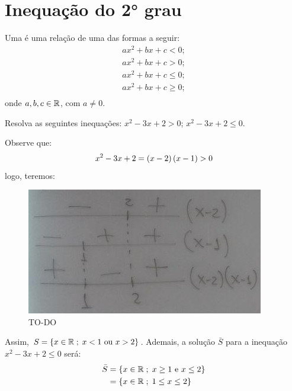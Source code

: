 \section{Inequação do 2° grau}

\begin{definition}
Uma  é uma relação de uma das formas
a seguir:
%
\begin{gather*}
ax^2 +bx + c <0;\\
ax^2 +bx + c>0;\\
ax^2 +bx + c \le 0;\\
ax^2 +bx + c \ge 0;\\
\end{gather*}
%
onde $a, b, c \in \mathbb{R}$, com $ a \ne 0$.
\end{definition}

\begin{example}
Resolva as seguintes inequações: $x^2 -3x +2 > 0$; $x^2 -3x +2 \le 0$.
\end{example}

\begin{solution}
Observe que: 
%
\begin{align*}
x^2-3x+2=\left(x-2\right)\left(x-1\right)>0
\end{align*}
%
\noindent logo, teremos:

\begin{figure}[H]
\caption{TO-DO}
\includegraphics{quadros/03_equacoes_e_inequacoes/08-24/[ok]photo_2018-08-24_22-55-35.jpg}
\centering
\end{figure}

Assim, $S = \left\{x \in \mathbb{R} \;;\;{x<1 \text{ ou } x>2}\right\}$. Ademais, a solução $\bar{S}$ para a inequação $x^2-3x+2\le0$ será:
%
\begin{align*}
\bar{S} &= \left\{x \in \mathbb{R} \;;\; x \ge 1 \text{ e } x \le 2\right\} \\
		&= \left\{x \in \mathbb{R} \;;\; 1 \le x \le 2\right\} 
\end{align*}
\end{solution}

